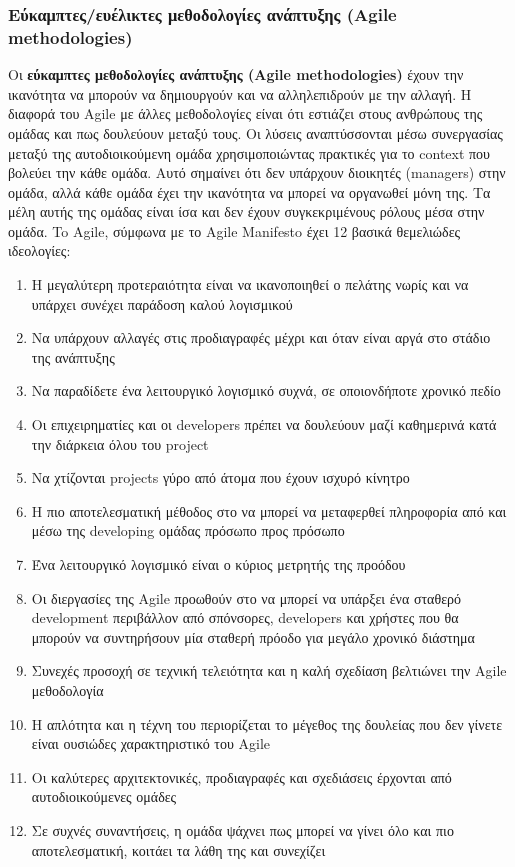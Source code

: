 \subsubsection{Εύκαμπτες/ευέλικτες μεθοδολογίες ανάπτυξης (Agile methodologies)}

Οι \textbf{εύκαμπτες μεθοδολογίες ανάπτυξης (Agile methodologies)} έχουν την ικανότητα να μπορούν να δημιουργούν και να αλληλεπιδρούν με την αλλαγή. 
Η διαφορά του Agile με άλλες μεθοδολογίες είναι ότι εστιάζει στους ανθρώπους της ομάδας και πως δουλεύουν μεταξύ τους. 
Οι λύσεις αναπτύσσονται μέσω συνεργασίας μεταξύ της αυτοδιοικούμενη ομάδα χρησιμοποιώντας πρακτικές για το context που βολεύει την κάθε ομάδα. 
Αυτό σημαίνει ότι δεν υπάρχουν διοικητές (managers) στην ομάδα, αλλά κάθε ομάδα έχει την ικανότητα να μπορεί να οργανωθεί μόνη της. 
Τα μέλη αυτής της ομάδας είναι ίσα και δεν έχουν συγκεκριμένους ρόλους μέσα στην ομάδα. 
To Agile, σύμφωνα με το Agile Manifesto έχει 12 βασικά θεμελιώδες ιδεολογίες:

\begin{enumerate}
    \item Η μεγαλύτερη προτεραιότητα είναι να ικανοποιηθεί ο πελάτης νωρίς και να υπάρχει συνέχει παράδοση καλού λογισμικού
    \item Να υπάρχουν αλλαγές στις προδιαγραφές μέχρι και όταν είναι αργά στο στάδιο της ανάπτυξης
    \item Να παραδίδετε ένα λειτουργικό λογισμικό συχνά, σε οποιονδήποτε χρονικό πεδίο
    \item Οι επιχειρηματίες και οι developers πρέπει να δουλεύουν μαζί καθημερινά κατά την διάρκεια όλου του project
    \item Να χτίζονται projects γύρο από άτομα που έχουν ισχυρό κίνητρο
    \item Η πιο αποτελεσματική μέθοδος στο να μπορεί να μεταφερθεί πληροφορία από και μέσω της developing ομάδας πρόσωπο προς πρόσωπο
    \item Ένα λειτουργικό λογισμικό είναι ο κύριος μετρητής της προόδου
    \item Οι διεργασίες της Agile προωθούν στο να μπορεί να υπάρξει ένα σταθερό development περιβάλλον από σπόνσορες, developers και χρήστες που θα μπορούν να συντηρήσουν μία σταθερή πρόοδο για μεγάλο χρονικό διάστημα
    \item Συνεχές προσοχή σε τεχνική τελειότητα και η καλή σχεδίαση βελτιώνει την Agile μεθοδολογία
    \item Η απλότητα και η τέχνη του περιορίζεται το μέγεθος της δουλείας που δεν γίνετε είναι ουσιώδες χαρακτηριστικό του Agile
    \item Οι καλύτερες αρχιτεκτονικές, προδιαγραφές και σχεδιάσεις έρχονται από αυτοδιοικούμενες ομάδες
    \item Σε συχνές συναντήσεις, η ομάδα ψάχνει πως μπορεί να γίνει όλο και πιο αποτελεσματική, κοιτάει τα λάθη της και συνεχίζει
\end{enumerate}

